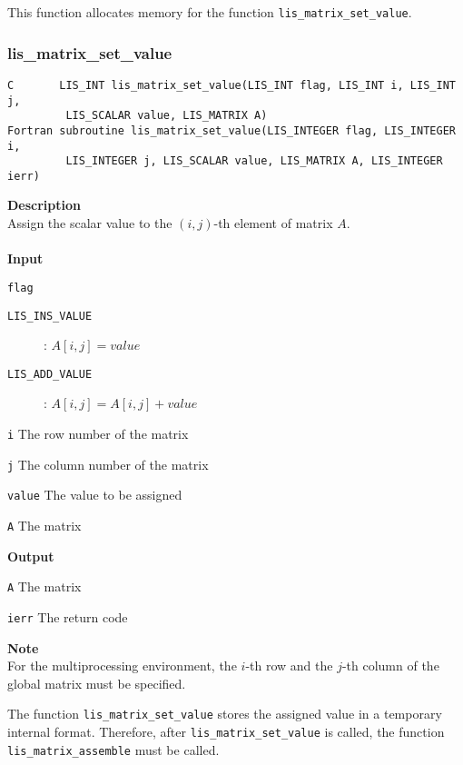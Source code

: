\documentclass[a4paper]{article}
\newcommand{\namelistlabel}[1]{\mbox{#1}\hfill}
\newenvironment{namelist}[1]{%
\begin{list}{}
  {\let\makelabel\namelistlabel
  \settowidth{\labelwidth}{#1}
  \setlength{\leftmargin}{1.1\labelwidth}}
  }{%
\end{list}}
\begin{document}
This function allocates memory for the function \verb|lis_matrix_set_value|.

\newpage
\subsubsection{lis\_matrix\_set\_value}
\begin{screen}
\verb|C       LIS_INT lis_matrix_set_value(LIS_INT flag, LIS_INT i, LIS_INT j,|\\
\verb|         LIS_SCALAR value, LIS_MATRIX A)|\\
\verb|Fortran subroutine lis_matrix_set_value(LIS_INTEGER flag, LIS_INTEGER i,|\\
\verb|         LIS_INTEGER j, LIS_SCALAR value, LIS_MATRIX A, LIS_INTEGER ierr)|
\end{screen}
{\bf Description}\\
\indent
Assign the scalar value to the $(i, j)$-th element of matrix $A$.
\\ \\
\noindent
{\bf Input}
\begin{namelist}{XXXXXXXXXXXXXXXXXXXX}
\item[\tt flag] \begin{description}
\item[\tt LIS\_INS\_VALUE]: $A[i,j] = value$
\item[\tt LIS\_ADD\_VALUE]: $A[i,j] = A[i,j] + value$
\end{description}
\item[\tt i] The row number of the matrix
\item[\tt j] The column number of the matrix
\item[\tt value] The value to be assigned
\item[\tt A] The matrix
\end{namelist}
{\bf Output}
\begin{namelist}{XXXXXXXXXXXXXXXXXXXX}
\item[\tt A] The matrix 
\item[\tt ierr] The return code
\end{namelist}
\noindent
{\bf Note}\\
\indent
For the multiprocessing environment, the $i$-th row and the $j$-th column of the global matrix must 
be specified. 

The function \verb|lis_matrix_set_value| stores the assigned value in a temporary internal format. 
Therefore, after \verb|lis_matrix_set_value| is called, 
the function \verb|lis_matrix_assemble| must be called.
\end{document}
